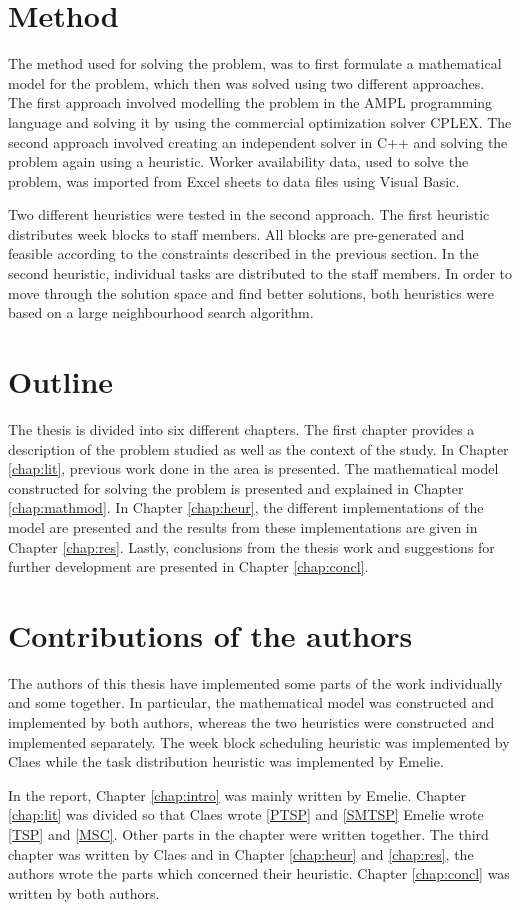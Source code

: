 \section{Method}
The method used for solving the problem, was to first formulate a mathematical model for the problem, which then was solved using two different approaches. The first approach involved modelling the problem in the AMPL programming language and solving it by using the commercial optimization solver CPLEX. The second approach involved creating an independent solver in C++ and solving the problem again using a heuristic. Worker availability data, used to solve the problem, was imported from Excel sheets to data files using Visual Basic.

Two different heuristics were tested in the second approach. The first heuristic distributes week blocks to staff members. All blocks are pre-generated and feasible according to the constraints described in the previous section. In the second heuristic, individual tasks are distributed to the staff members. In order to move through the solution space and find better solutions, both heuristics were based on a large neighbourhood search algorithm.

\section{Outline}

The thesis is divided into six different chapters. The first chapter provides a description of the problem studied as well as the context of the study. In Chapter \ref{chap:lit}, previous work done in the area is presented. The mathematical model constructed for solving the problem is presented and explained in Chapter \ref{chap:mathmod}. In Chapter \ref{chap:heur}, the different implementations of the model are presented and the results from these implementations are given in Chapter \ref{chap:res}. Lastly, conclusions from the thesis work and suggestions for further development are presented in Chapter \ref{chap:concl}.

\section{Contributions of the authors}

The authors of this thesis have implemented some parts of the work individually and some together. In particular, the mathematical model was constructed and implemented by both authors, whereas the two heuristics were constructed and implemented separately. The week block scheduling heuristic was implemented by Claes while the task distribution heuristic was implemented by Emelie.

In the report, Chapter \ref{chap:intro} was mainly written by Emelie. Chapter \ref{chap:lit} was divided so that Claes wrote \ref{PTSP} and \ref{SMTSP} Emelie wrote \ref{TSP} and \ref{MSC}. Other parts in the chapter were written together. The third chapter was written by Claes and in Chapter \ref{chap:heur} and \ref{chap:res}, the authors wrote the parts which concerned their heuristic. Chapter \ref{chap:concl} was written by both authors.
 

